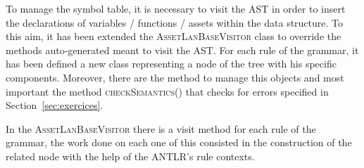 \documentclass[11pt]{article} %
\begin{document}
To manage the symbol table, it is necessary to visit the AST in order to insert the declarations of variables / functions / assets within the data structure. To this aim, it has been extended the \textsc{AssetLanBaseVisitor} class to override the methods auto-generated meant to visit the AST. For each rule of the grammar, it has been defined a new class representing a node of the tree with his specific components. Moreover, there are the method to manage this objects and most important the method \textsc{checkSemantics()} that checks for errors specified in Section~\ref{sec:exercices}.

\medskip

In the \textsc{AssetLanBaseVisitor} there is a visit method for each rule of the grammar, the work done on each one of this consisted in the construction of the related node with the help of the ANTLR's rule contexts. 
\end{document}
